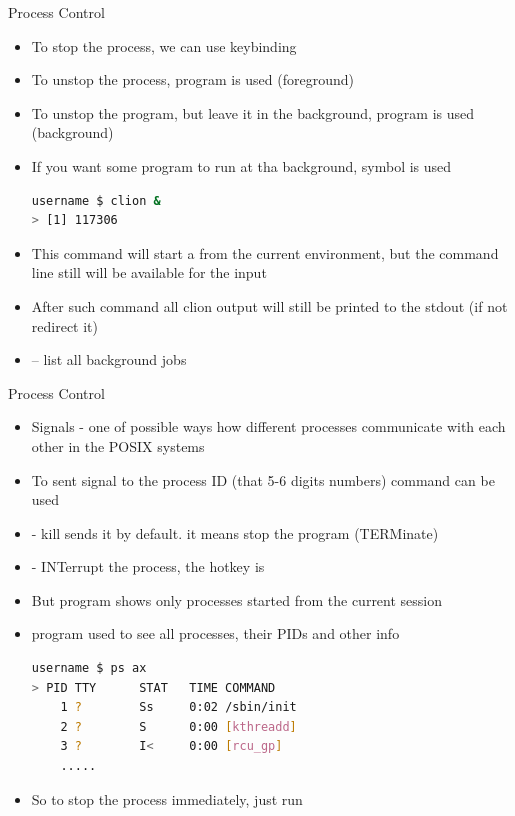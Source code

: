\documentclass[usenames,dvipsnames,10pt,aspectratio=169]{beamer}
\begin{document}
\begin{frame}[fragile]{Process Control}
    \begin{itemize}
        \item To stop the process, we can use  keybinding
        \item To unstop the process,  program is used (foreground)
        \item To unstop the program, but leave it in the background,  program is used (background)
        \item If you want some program to run at tha background, \ex{\&} symbol is used
        \begin{lstlisting}[language=bash, style=shellstyle]
username $ clion &
> [1] 117306 \end{lstlisting}
        \item This command will start a  from the current environment, but the command line still will be available for the input
        \item {} After such command all clion output will still be printed to the stdout (if not redirect it)
        \item {} -- list all background jobs
    \end{itemize}
\end{frame}

\begin{frame}[fragile]{Process Control}
    \begin{itemize}
        \item Signals - one of possible ways how different processes communicate with each other in the POSIX systems
        \item To sent signal to the process ID (that 5-6 digits numbers)  command can be used
        \item {} - kill sends it by default. it means stop the program (TERMinate)
        \item {} - INTerrupt the process, the hotkey is 
        \item But  program shows only processes started from the current session
        \item {} program used to see all processes, their PIDs and other info
        \begin{lstlisting}[language=bash, style=shellstyle]
username $ ps ax
> PID TTY      STAT   TIME COMMAND
    1 ?        Ss     0:02 /sbin/init     
    2 ?        S      0:00 [kthreadd]
    3 ?        I<     0:00 [rcu_gp]
    .....\end{lstlisting}
        \item So to stop the process immediately, just run 
    \end{itemize}
    
\end{frame}
\end{document}
